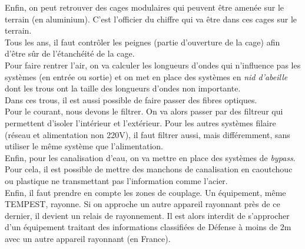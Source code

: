 Enfin, on peut retrouver des cages modulaires qui peuvent être amenée sur le terrain (en aluminium). C'est l'officier du chiffre qui va être dans ces cages sur le terrain.\\
Tous les ans, il faut contrôler les peignes (partie d'ouverture de la cage) afin d'être sûr de l'étanchéité de la cage.\\
Pour faire rentrer l'air, on va calculer les longueurs d'ondes qui n'influence pas les systèmes (en entrée ou sortie) et on met en place des systèmes en \textit{nid d'abeille} dont les trous ont la taille des longueurs d'ondes non importante.\\
Dans ces trous, il est aussi possible de faire passer des fibres optiques.\\
Pour le courant, nous devons le filtrer. On va alors passer par des filtreur qui permettent d'isoler l'intérieur et l'extérieur. Pour les autres systèmes filaire (réseau et alimentation non 220V), il faut filtrer aussi, mais différemment, sans utiliser le même système que l'alimentation.\\
Enfin, pour les canalisation d'eau, on va mettre en place des systèmes de \textit{bypass}. Pour cela, il est possible de mettre des manchons de canalisation en caoutchouc ou plastique ne transmettant pas l'information comme l'acier.\\
Enfin, il faut prendre en compte les zones de couplage. Un équipement, même TEMPEST, rayonne. Si on approche un autre appareil rayonnant près de ce dernier, il devient un relais de rayonnement. Il est alors interdit de s'approcher d'un équipement traitant des informations classifiées de Défense à moins de 2m avec un autre appareil rayonnant (en France).